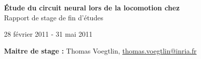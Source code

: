 
\vspace*{\fill}
\begin{center}
   \textbf{ {\Huge Étude du circuit neural lors de la locomotion chez \caeleg{}}}\\[0.5em]{\huge Rapport de stage de fin d'études}
\end{center}

\begin{center}
  28 février 2011 - 31 mai 2011
\end{center}

\begin{center}
   \textbf{Maitre de stage :} Thomas Voegtlin, \url{thomas.voegtlin@inria.fr}
\end{center}

\vspace*{\fill}

\newpage
